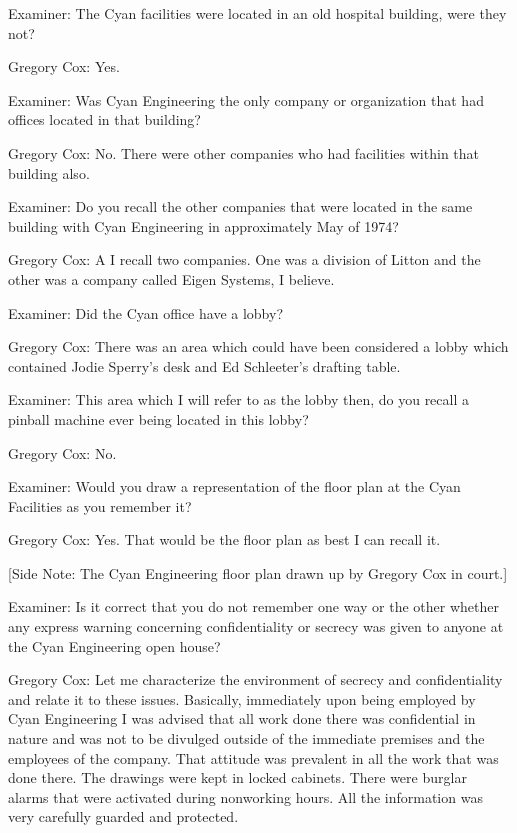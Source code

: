 \textcolor{interviewer}{Examiner:} The Cyan facilities were located in an old hospital building, were they not? 

\textcolor{interviewee}{Gregory Cox:} Yes. 

\textcolor{interviewer}{Examiner:} Was Cyan Engineering the only company or organization that had offices located in that building? 

\textcolor{interviewee}{Gregory Cox:} No. There were other companies who had facilities within that building also.

\textcolor{interviewer}{Examiner:} Do you recall the other companies that were located in the same building with Cyan Engineering in approximately May of 1974? 

\textcolor{interviewee}{Gregory Cox:} A I recall two companies. One was a division of Litton and the other was a company called Eigen Systems, I believe. 

\textcolor{interviewer}{Examiner:} Did the Cyan office have a lobby? 

\textcolor{interviewee}{Gregory Cox:} There was an area which could have been considered a lobby which contained Jodie Sperry's desk and Ed Schleeter's drafting table.

\textcolor{interviewer}{Examiner:} This area which I will refer to as the lobby then, do you recall a pinball machine ever being located in this lobby?

\textcolor{interviewee}{Gregory Cox:} No.

\textcolor{interviewer}{Examiner:} Would you draw a representation of the floor plan at the Cyan Facilities as you remember it? 

\textcolor{interviewee}{Gregory Cox:} Yes. That would be the floor plan as best I can recall it.

[Side Note: The Cyan Engineering floor plan drawn up by Gregory Cox in court.]

\textcolor{interviewer}{Examiner:} Is it correct that you do not remember one way or the other whether any express warning concerning confidentiality or secrecy was given to anyone at the Cyan Engineering open house? 

\textcolor{interviewee}{Gregory Cox:} Let me characterize the environment of secrecy and confidentiality and relate it to these issues. Basically, immediately upon being employed by Cyan Engineering I was advised that all work done there was confidential in nature and was not to be divulged outside of the immediate premises and the employees of the company. That attitude was prevalent in all the work that was done there. The drawings were kept in locked cabinets. There were burglar alarms that were activated during nonworking hours. All the information was very carefully guarded and protected.

